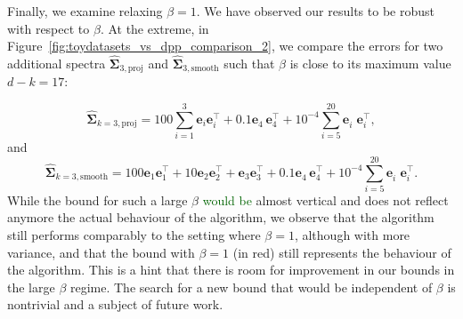 \documentclass[twoside,11pt]{book}
\newcommand{\rev}[1]{\textcolor{darkgreen}{#1}}
\numberwithin{theorem}{chapter}
\numberwithin{definition}{chapter}
\numberwithin{proposition}{chapter}
\numberwithin{corollary}{chapter}
\numberwithin{example}{chapter}
\numberwithin{lemma}{chapter}
\numberwithin{assumption}{chapter}
\DeclareMathOperator{\Tran}{\intercal}
\begin{document}
Finally, we examine relaxing $\beta=1$. We have observed our results to be robust with respect to $\beta$. At the extreme, in Figure~\ref{fig:toydatasets_vs_dpp_comparison_2}, we compare the errors for two additional spectra $\hat{\bm{\Sigma}}_{3,\text{proj}}$ and $\hat{\bm{\Sigma}}_{3,\text{smooth}}$ such that $\beta$ is close to its maximum value $d-k = 17$:

$$
    \hat{\bm{\Sigma}}_{k=3,\text{proj}} = 100 \sum\limits_{i = 1}^{3} \bm{e}_{i}\bm{e}_{i}^{\Tran} + 0.1\bm{e}_{4}^{\phantom{\Tran}}\bm{e}_{4}^{\Tran} + 10^{-4} \sum\limits_{i = 5}^{20} \bm{e}_{i}^{\phantom{\Tran}}\bm{e}_{i}^{\Tran}, $$
and
$$
    \hat{\bm{\Sigma}}_{k=3,\text{smooth}} = 100\bm{e}_{1}\bm{e}_{1}^{\Tran} + 10\bm{e}_{2}\bm{e}_{2}^{\Tran} + \bm{e}_{3}\bm{e}_{3}^{\Tran} + 0.1\bm{e}_{4}^{\phantom{\Tran}}\bm{e}_{4}^{\Tran} + 10^{-4} \sum\limits_{i = 5}^{20} \bm{e}_{i}^{\phantom{\Tran}}\bm{e}_{i}^{\Tran}.$$
 While the bound for such a large $\beta$ \rev{would be} almost vertical and does not reflect anymore the actual behaviour of the algorithm, we observe that the algorithm still performs comparably to the setting where $\beta=1$, although with more variance, and that the bound with $\beta = 1$ (in red) still represents the behaviour of the algorithm. This is a hint that there is room for improvement in our bounds in the large $\beta$ regime. The search for a new bound that would be independent of $\beta$ is nontrivial and a subject of future work.
\end{document}
